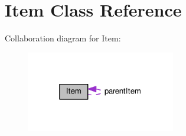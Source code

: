 \hypertarget{class_item}{}\section{Item Class Reference}
\label{class_item}


Collaboration diagram for Item\+:\nopagebreak
\begin{figure}[H]
\begin{center}
\leavevmode
\includegraphics[width=184pt]{class_item__coll__graph}
\end{center}
\end{figure}
